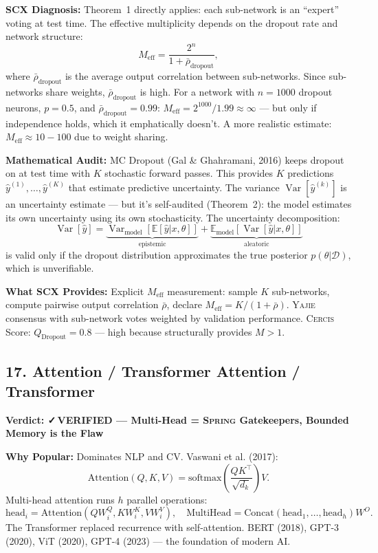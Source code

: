 \documentclass[12pt,a4paper]{article}
\theoremstyle{definition}
\newcommand{\verified}{{\color{verifiedcolor}\textbf{✓\,VERIFIED}}}
\newcommand{\Yajie}{\textsc{Yajie}}
\newcommand{\Spring}{\textsc{Spring}}
\newcommand{\Cercis}{\textsc{Cercis}}
\DeclareMathOperator{\Var}{Var}
\newcommand{\E}{\mathbb{E}}
\newcommand{\cD}{\mathcal{D}}
\newcommand{\auditHeader}[1]{\medskip\noindent\textbf{\large #1}\medskip}
\newcommand{\whyPopular}{\noindent\textbf{Why Popular:} }
\newcommand{\whatMissing}{\noindent\textbf{What SCX Provides:} }
\newcommand{\diagnosis}{\noindent\textbf{SCX Diagnosis:} }
\newcommand{\mathAudit}{\noindent\textbf{Mathematical Audit:} }
\begin{document}
\diagnosis{} Theorem~1 directly applies: each sub-network is an ``expert'' voting at test time. The effective multiplicity depends on the dropout rate and network structure:
\[
M_{\text{eff}} = \frac{2^n}{1 + \bar{\rho}_{\text{dropout}}},
\]
where $\bar{\rho}_{\text{dropout}}$ is the average output correlation between sub-networks. Since sub-networks share weights, $\bar{\rho}_{\text{dropout}}$ is high. For a network with $n=1000$ dropout neurons, $p=0.5$, and $\bar{\rho}_{\text{dropout}}=0.99$: $M_{\text{eff}} = 2^{1000}/1.99 \approx \infty$ — but only if independence holds, which it emphatically doesn't. A more realistic estimate: $M_{\text{eff}} \approx 10-100$ due to weight sharing.

\mathAudit{} MC Dropout (Gal \& Ghahramani, 2016) keeps dropout on at test time with $K$ stochastic forward passes. This provides $K$ predictions $\hat{y}^{(1)}, \ldots, \hat{y}^{(K)}$ that estimate predictive uncertainty. The variance $\Var[\hat{y}^{(k)}]$ is an uncertainty estimate — but it's self-audited (Theorem~2): the model estimates its own uncertainty using its own stochasticity. The uncertainty decomposition:
\[
\Var[\hat{y}] = \underbrace{\Var_{\text{model}}[\E[\hat{y}|x,\theta]]}_{\text{epistemic}} + \underbrace{\E_{\text{model}}[\Var[\hat{y}|x,\theta]]}_{\text{aleatoric}}
\]
is valid only if the dropout distribution approximates the true posterior $p(\theta|\cD)$, which is unverifiable.

\whatMissing{} Explicit $M_{\text{eff}}$ measurement: sample $K$ sub-networks, compute pairwise output correlation $\bar{\rho}$, declare $M_{\text{eff}} = K/(1+\bar{\rho})$. \Yajie{} consensus with sub-network votes weighted by validation performance. \Cercis{} Score: $Q_{\text{Dropout}} = 0.8$ — high because structurally provides $M>1$.

\subsection{17. Attention / Transformer Attention / Transformer}

\auditHeader{Verdict: \verified{} — Multi-Head = \Spring{} Gatekeepers, Bounded Memory is the Flaw}

\whyPopular{} Dominates NLP and CV. Vaswani et al. (2017):
\[
\text{Attention}(Q, K, V) = \text{softmax}\left(\frac{QK^\top}{\sqrt{d_k}}\right)V.
\]
Multi-head attention runs $h$ parallel operations:
\[
\text{head}_i = \text{Attention}(QW_i^Q, KW_i^K, VW_i^V), \quad \text{MultiHead} = \text{Concat}(\text{head}_1, \ldots, \text{head}_h)W^O.
\]
The Transformer replaced recurrence with self-attention. BERT (2018), GPT-3 (2020), ViT (2020), GPT-4 (2023) — the foundation of modern AI.
\end{document}
